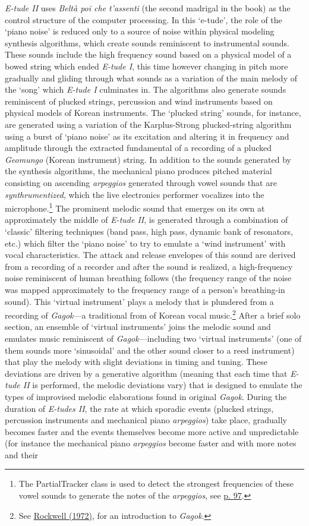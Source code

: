 \emph{E-tude II} uses \emph{Belt\`{a} poi che t'assenti} (the second madrigal in the book) as the control structure of the computer processing. In this `e-tude', the role of the `piano noise' is reduced only to a source of noise within physical modeling synthesis algorithms, which create sounds reminiscent to instrumental sounds. These sounds include the high frequency sound based on a physical model of a bowed string which ended \emph{E-tude I}, this time however changing in pitch more gradually and gliding through what sounds as a variation of the main melody of the `song' which \emph{E-tude I} culminates in. The algorithms also generate sounds reminiscent of plucked strings, percussion and wind instruments based on physical models of Korean instruments. The `plucked string' sounds, for instance, are generated using a variation of the Karplus-Strong plucked-string algorithm using a burst of `piano noise' as its excitation and altering it in frequency and amplitude through the extracted fundamental of a recording of a plucked \emph{Geomungo} (Korean instrument) string. In addition to the sounds generated by the synthesis algorithms, the mechanical piano produces pitched material consisting on ascending \emph{arpeggios} generated through vowel sounds that are \emph{synthrumentized}, which the live electronics performer vocalizes into the microphone.\footnote{The PartialTracker class is used to detect the strongest frequencies of these vowel sounds to generate the notes of the \emph{arpeggios}, see \hyperlink{partrack}{p. 97}.} The prominent melodic sound that emerges on its own at approximately the middle of \emph{E-tude II}, is generated through a combination of `classic' filtering techniques (band pass, high pass, dynamic bank of resonators, etc.) which filter the `piano noise' to try to emulate a `wind instrument' with vocal characteristics. The attack and release envelopes of this sound are derived from a recording of a recorder and after the sound is realized, a high-frequency noise reminiscent of human breathing follows (the frequency range of the noise was mapped approximately to the frequency range of a person's breathing-in sound). This `virtual instrument' plays a melody that is plundered from a recording of \emph{Gagok}---a traditional from of Korean vocal music.\footnote{See \hyperlink{rockwell}{Rockwell (1972)}, for an introduction to \emph{Gagok}.} After a brief solo section, an ensemble of `virtual instruments' joins the melodic sound and emulates music reminiscent of \emph{Gagok}---including two `virtual instruments' (one of them sounds more `sinusoidal' and the other sound closer to a reed instrument) that play the melody with slight deviations in timing and tuning. These deviations are driven by a generative algorithm (meaning that each time that \emph{E-tude II} is performed, the melodic deviations vary) that is designed to emulate the types of improvised melodic elaborations found in original \emph{Gagok}. During the duration of \emph{E-tudes II}, the rate at which sporadic events (plucked strings, percussion instruments and mechanical piano \emph{arpeggios}) take place, gradually becomes faster and the events themselves become more active and unpredictable (for instance the mechanical piano \emph{arpeggios} become faster and with more notes and their 